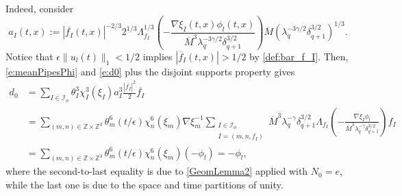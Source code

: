\documentclass[10pt,a4paper]{amsart}
\numberwithin{equation}{section}
\numberwithin{corollario}{section}
\numberwithin{lemma}{section}
\numberwithin{prop}{section}
\theoremstyle{definition}
\theoremstyle{remark}
\newcommand{\Z}{\mathbb{Z}}
\begin{document}
Indeed, consider
\begin{equation}\label{e:amplPhi}
a_I(t,x):=|\overline{f_I}(t,x)|^{-2/3}2^{1/3}\Lambda_{f_I}^{1/3}\left(-\frac{\nabla\xi_I(t,x)\phi_l(t,x)}{\overline{M}^3\lambda_q^{-3\gamma/2}\delta_{q+1}^{3/2}}\right)\overline{M}(\lambda_q^{-3\gamma/2}\delta_{q+1}^{3/2})^{1/3}. 
\end{equation}
Notice that $\epsilon\|u_l(t)\|_1<1/2$ implies $|\overline{f}_I(t,x)|>1/2$ by \eqref{def:bar_f_I}.
Then, \eqref{e:meanPipesPhi} and \eqref{e:d0} plus the disjoint supports property gives
\begin{equation}
    \begin{aligned}
        d_0
        &=
        \sum_{I\in \mathcal{I_{\phi}}}\theta^3_I\chi_I^3(\xi_I)a_I^3\frac{|\overline{f_I}|^2}2\overline{f_I}
        \\
        &=
        \sum_{(m,n)\in\Z\times \Z^3}\theta_{m}^6(t/\epsilon)\chi_n^6(\xi_m)\nabla\xi_m^{-1}\sum_{\substack{I\in  \mathcal{I}_{\phi}
        \\ I=(m,n,f_I)}}\overline{M}^3\lambda_q^{-\gamma}\delta_{q+1}^{3/2}\Lambda_{f_I}\left(-\frac{\nabla\xi_I\phi_l}{\overline{M}^3\lambda_q^{-\gamma}\delta_{q+1}^{3/2}}\right)f_I
        \\
        &= 
        \sum_{(m,n)\in\Z\times \Z^3}
        \theta_{m}^6(t/\epsilon)
        \chi_n^6(\xi_m)(-\phi_l)=-\phi_l,
    \end{aligned}
\end{equation}
where the second-to-last equality is due to \autoref{GeomLemma2} applied with $N_0=e$, while the last one is due to the space and time partitions of unity.
\end{document}
